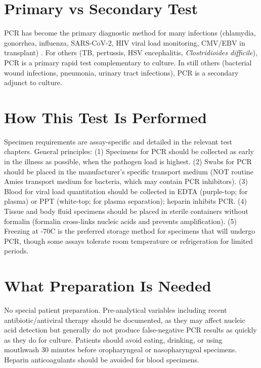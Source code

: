 \section*{Primary vs Secondary Test}
PCR has become the primary diagnostic method for many infections (chlamydia, gonorrhea, influenza, SARS-CoV-2, HIV viral load monitoring, CMV/EBV in transplant) \cite{caliendo2013better}. For others (TB, pertussis, HSV encephalitis, \textit{Clostridioides difficile}), PCR is a primary rapid test complementary to culture. In still others (bacterial wound infections, pneumonia, urinary tract infections), PCR is a secondary adjunct to culture.

\section*{How This Test Is Performed}
Specimen requirements are assay-specific and detailed in the relevant test chapters. General principles: (1) Specimens for PCR should be collected as early in the illness as possible, when the pathogen load is highest. (2) Swabs for PCR should be placed in the manufacturer's specific transport medium (NOT routine Amies transport medium for bacteria, which may contain PCR inhibitors). (3) Blood for viral load quantitation should be collected in EDTA (purple-top; for plasma) or PPT (white-top; for plasma separation); heparin inhibits PCR. (4) Tissue and body fluid specimens should be placed in sterile containers without formalin (formalin cross-links nucleic acids and prevents amplification). (5) Freezing at -70\textdegree{}C is the preferred storage method for specimens that will undergo PCR, though some assays tolerate room temperature or refrigeration for limited periods.

\section*{What Preparation Is Needed}
No special patient preparation. Pre-analytical variables including recent antibiotic/antiviral therapy should be documented, as they may affect nucleic acid detection but generally do not produce false-negative PCR results as quickly as they do for culture. Patients should avoid eating, drinking, or using mouthwash 30 minutes before oropharyngeal or nasopharyngeal specimens. Heparin anticoagulants should be avoided for blood specimens.

